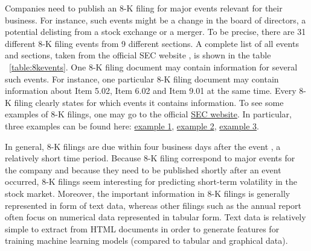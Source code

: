 \documentclass{article}
\begin{document}
	Companies need to publish an 8-K filing for major events relevant for their business. For instance, such events might be a change in the board of directors, a potential delisting from a stock exchange or a merger. To be precise, there are 31 different 8-K filing events from 9 different sections. A complete list of all events and sections, taken from the official SEC website \cite{noauthor_sec.gov_nodate-1}, is shown in the table ~\ref{table:8kevents}. One 8-K filing document may contain information for several such events. For instance, one particular 8-K filing document may contain information about Item 5.02, Item 6.02 and Item 9.01 at the same time. Every 8-K filing clearly states for which events it contains information. To see some examples of 8-K filings, one may go to the official  \href{https://www.sec.gov/cgi-bin/browse-edgar?company=&CIK=&type=8-K&owner=include&count=40&action=getcurrent}{SEC website}. In particular, three examples can be found here: \href{https://www.sec.gov/ix?doc=/Archives/edgar/data/1339947/000119312519299728/d840037d8k.htm}{example 1}, \href{https://www.sec.gov/Archives/edgar/data/883975/000149315219018330/form8-k.htm}{example 2}, \href{https://www.sec.gov/Archives/edgar/data/1419275/000118518519001650/greenbox20191125_8k.htm}{example 3}.
	
	In general, 8-K filings are  due within four business days after the event \cite{kenton_8-k_nodate}, a relatively short time period. Because 8-K filing correspond to major events for the company and because they need to be published shortly after an event occurred, 8-K filings seem interesting for predicting short-term volatility in the stock market. Moreover, the important information in 8-K filings is generally represented in form of text data, whereas other filings such as the annual report often focus on numerical data represented in tabular form. Text data is relatively simple to extract from HTML documents in order to generate features for training machine learning models (compared to tabular and graphical data).
	
\end{document}
